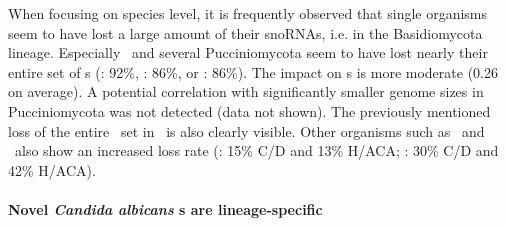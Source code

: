 
When focusing on species level, it is frequently observed that single
organisms seem to have lost a large amount of their snoRNAs, i.e. in the  Basidiomycota lineage. 
Especially \wse\ and several Pucciniomycota seem to have lost nearly their entire set of \haca s (\wse: 92\%, \rmi: 86\%,
or \sli: 86\%). The impact on \cd s is more moderate (0.26 on
average). A potential correlation with significantly smaller genome
sizes in Pucciniomycota was not detected (data not shown). The
previously mentioned loss of the entire \haca\ set in \Ptt\ is also clearly
visible. Other organisms such
as \pan\ and  \opi\ also show an increased loss rate (\pan: 15\% C/D
and 13\% H/ACA; \opi: 30\% C/D and 42\% H/ACA). 



\paragraph{\textbf{Novel \emph{Candida albicans} \sno s are lineage-specific}}

